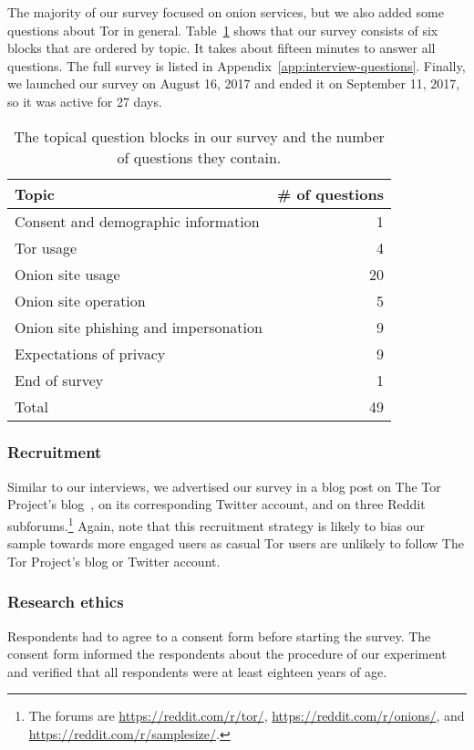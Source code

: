 The majority of our survey focused on onion services, but we also added some
questions about Tor in general.  Table~\ref{tab:survey-structure} shows that our
survey consists of six blocks that are ordered by topic.  It takes about fifteen
minutes to answer all questions.  The full survey is listed in
Appendix~\ref{app:interview-questions}.  Finally, we launched our survey on
August 16, 2017 and ended it on September 11, 2017, so it was active for 27
days.

\begin{table}[t]
	\centering
	\begin{tabular}{l r}
	\toprule
	Topic & \# of questions \\
	\midrule
	Consent and demographic information & 1 \\
	Tor usage & 4 \\
	Onion site usage & 20 \\
	Onion site operation & 5 \\
	Onion site phishing and impersonation & 9 \\
	Expectations of privacy & 9 \\
	End of survey & 1 \\
	\midrule
	Total & 49 \\
	\bottomrule
	\end{tabular}
	\caption{The topical question blocks in our survey and the number of
	questions they contain.}
	\label{tab:survey-structure}
\end{table}

\subsubsection{Recruitment}

Similar to our interviews, we advertised our survey in a blog post on The Tor
Project's blog~\cite{Winter2017a}, on its corresponding Twitter account, and on
three Reddit subforums.\footnote{The forums are \url{https://reddit.com/r/tor/},
\url{https://reddit.com/r/onions/}, and \url{https://reddit.com/r/samplesize/}.}
Again, note that this recruitment strategy is likely to bias our sample towards
more engaged users as casual Tor users are unlikely to follow The Tor Project's
blog or Twitter account.

\subsubsection{Research ethics}
Respondents had to agree to a consent form before starting the survey. The
consent form informed the respondents about the procedure of our experiment and
verified that all respondents were at least eighteen years of age.

